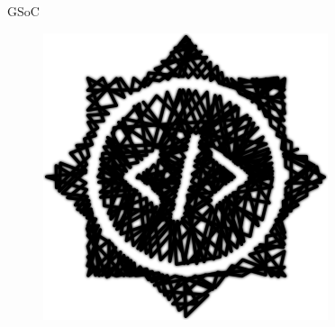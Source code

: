 \documentclass[10pt, compress, aspectratio=169]{beamer}
\begin{document}
\begin{frame}{GSoC}
  \begin{figure}
    \centering
    \includegraphics[width=\linewidth,
                     height=0.8\textheight,
                     keepaspectratio]{gsoc}
  \end{figure}
\end{frame}
\end{document}
